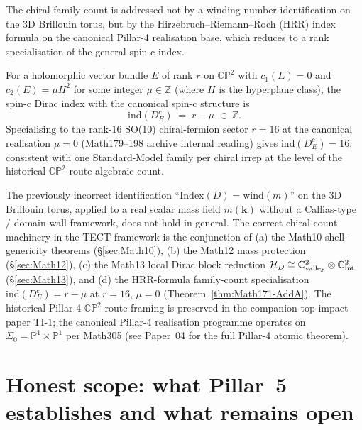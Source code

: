 The chiral family count is addressed not by a winding-number
identification on the 3D Brillouin torus, but by the
Hirzebruch--Riemann--Roch (HRR) index formula on the canonical Pillar-4
realisation base, which reduces to a rank specialisation of the
general spin-c index.

\begin{theorem}
\label{thm:Math171-AddA}
For a holomorphic vector bundle $E$ of rank $r$ on $\mathbb{CP}^2$
with $c_1(E) = 0$ and $c_2(E) = \mu H^2$ for some integer $\mu \in
\mathbb{Z}$ (where $H$ is the hyperplane class), the spin-c Dirac
index with the canonical spin-c structure is
\[
\mathrm{ind}(D_E^c) \;=\; r - \mu \;\in\; \mathbb{Z}.
\]
Specialising to the rank-16 SO(10) chiral-fermion sector $r = 16$
at the canonical realisation $\mu = 0$ (Math179--198 archive
internal reading) gives $\mathrm{ind}(D_E^c) = 16$, consistent with
one Standard-Model family per chiral irrep at the level of the
historical $\mathbb{CP}^2$-route algebraic count.
\end{theorem}

\begin{remark}[Replacement of the $\mathrm{Index}(D) =
\mathrm{wind}(m)$ identification]
\label{rem:no-wind-identification}
The previously incorrect identification ``$\mathrm{Index}(D) =
\mathrm{wind}(m)$'' on the 3D Brillouin torus, applied to a real
scalar mass field $m(\mathbf{k})$ without a Callias-type / domain-wall
framework, does not hold in general. The correct chiral-count
machinery in the TECT framework is the conjunction of (a) the Math10
shell-genericity theorems (\S\ref{sec:Math10}), (b) the Math12 mass
protection (\S\ref{sec:Math12}), (c) the Math13 local Dirac block
reduction $\mathcal{H}_D \cong \mathbb{C}^2_{\rm valley} \otimes
\mathbb{C}^2_{\rm int}$ (\S\ref{sec:Math13}), and (d) the
HRR-formula family-count specialisation
$\mathrm{ind}(D_E^c) = r - \mu$ at $r = 16$, $\mu = 0$
(Theorem~\ref{thm:Math171-AddA}). The historical Pillar-4
$\mathbb{CP}^2$-route framing is preserved in the companion
top-impact paper TI-1; the canonical Pillar-4 realisation programme
operates on $\Sigma_0 = \mathbb{P}^1 \times \mathbb{P}^1$ per
Math305 (see Paper~04 for the full Pillar-4 atomic theorem).
\end{remark}

\section{Honest scope: what Pillar~5 establishes and what remains
open}\label{sec:scope}

